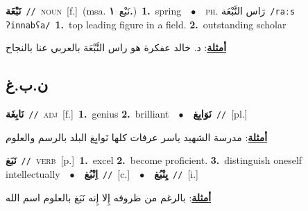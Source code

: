 \documentclass[10pt,a4paper,twoside]{article} %
\begin{document}
\begin{multicols}{2}
{\setlength\topsep{0pt}\textbf{\foreignlanguage{arabic}{نَبْعَة}}\ {\color{gray}\texttt{//}\color{black}}\ \textsc{noun}\ [f.]\ \color{gray}(msa. \foreignlanguage{arabic}{نَبْع}~\foreignlanguage{arabic}{\textbf{١.}})\color{black}\ \textbf{1.}~spring\ \ $\bullet$\ \ \textsc{ph.} \color{gray} \foreignlanguage{arabic}{رَاس النَّبْعَة}\color{black}\ {\color{gray}\texttt{/{\sffamily raːs ʔinnabʕa}/}\color{black}}\ \textbf{1.}~top leading figure in a field.  \textbf{2.}~outstanding scholar\  \begin{flushright}\color{gray}\foreignlanguage{arabic}{\textbf{\underline{\foreignlanguage{arabic}{أمثلة}}}: د. خالد عفكرة هو راس النَّبْعَة بالعربي عنا بالنجاح}\end{flushright}\color{black}} \vspace{2mm}

\vspace{-3mm}
\subsection*{\color{blue}\foreignlanguage{arabic}{ن.ب.غ}\color{blue}{}} 

{\setlength\topsep{0pt}\textbf{\foreignlanguage{arabic}{نَابِغَة}}\ {\color{gray}\texttt{//}\color{black}}\ \textsc{adj}\ [f.]\ \textbf{1.}~genius  \textbf{2.}~brilliant\ \ $\bullet$\ \ \setlength\topsep{0pt}\textbf{\foreignlanguage{arabic}{نَوَابِغ}}\ {\color{gray}\texttt{//}\color{black}}\ [pl.]\  \begin{flushright}\color{gray}\foreignlanguage{arabic}{\textbf{\underline{\foreignlanguage{arabic}{أمثلة}}}: مدرسة الشهيد ياسر عرفات كلها نَوابِغ البلد بالرسم والعلوم}\end{flushright}\color{black}} \vspace{2mm}

{\setlength\topsep{0pt}\textbf{\foreignlanguage{arabic}{نَبَغ}}\ {\color{gray}\texttt{//}\color{black}}\ \textsc{verb}\ [p.]\ \textbf{1.}~excel  \textbf{2.}~become proficient.  \textbf{3.}~distinguish oneself intellectually\ \ $\bullet$\ \ \setlength\topsep{0pt}\textbf{\foreignlanguage{arabic}{اِنْبُغ}}\ {\color{gray}\texttt{//}\color{black}}\ [c.]\ \ $\bullet$\ \ \setlength\topsep{0pt}\textbf{\foreignlanguage{arabic}{يِنْبُغ}}\ {\color{gray}\texttt{//}\color{black}}\ [i.]\  \begin{flushright}\color{gray}\foreignlanguage{arabic}{\textbf{\underline{\foreignlanguage{arabic}{أمثلة}}}: بالرغم من ظروفه إِلا إِنه نَبَغ بالعلوم اسم الله}\end{flushright}\color{black}} \vspace{2mm}


\end{multicols}
\end{document}
